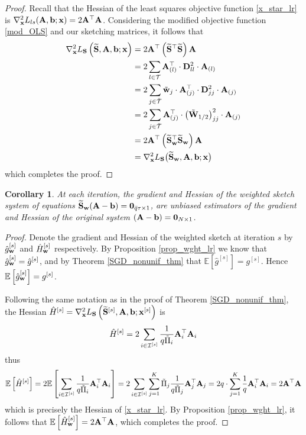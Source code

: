 \documentclass[journal,letterpaper,onecolumn,twoside,nofonttune]{IEEEtran}
\newcommand{\E}{\mathbb{E}}
\newcommand{\I}{\mathcal{I}}
\newcommand{\Tcal}{\mathcal{T}}
\newcommand{\Tbar}{\bar{\mathcal{T}}}
\newcommand{\bb}{\bold{b}}
\newcommand{\qbar}{\bar{q}}
\newcommand{\xb}{\bold{x}}
\newcommand{\Ab}{\bold{A}}
\newcommand{\Db}{\bold{D}}
\newcommand{\Sb}{\bold{S}}
\newcommand{\Sbwt}{\widetilde{\Sb}}
\newcommand{\Sbw}{\Sbwt_{\wb}}
\newcommand{\wb}{\bold{w}}
\newcommand{\Wb}{\bold{W}}
\newcommand{\gh}{\hat{g}}
\newcommand{\Hh}{\hat{H}}
\newcommand{\Pit}{\tilde{\Pi}}
\newcommand{\wbt}{\tilde{\wb}}
\newcommand{\Wbt}{\tilde{\Wb}}
\newtheorem{Cor}{Corollary}
\begin{document}
\begin{proof}
Recall that the Hessian of the least squares objective function \eqref{x_star_lr} is $\nabla_{\xb}^2L_{ls}(\Ab,\bb;\xb)=2\Ab^\top\Ab$. Considering the modified objective function \eqref{mod_OLS} and our sketching matrices, it follows that
\begin{align*}
  \nabla_{\xb}^2L_\Sb\left(\Sbwt,\Ab,\bb;\xb\right) &= 2\Ab^\top\left(\Sbwt^\top\Sbwt\right)\Ab\\
  &= 2\sum\limits_{l\in\Tcal}\Ab_{(l)}^\top \cdot\Db_{ll}^2 \cdot \Ab_{(l)}\\
  &= 2\sum\limits_{j\in\Tbar}\wbt_j\cdot\Ab_{(j)}^\top \cdot\Db_{jj}^2 \cdot \Ab_{(j)}\\
  &= 2\sum\limits_{j\in\Tbar}\Ab_{(j)}^\top \cdot\big(\Wbt_{1/2}\big)_{jj}^2 \cdot \Ab_{(j)}\\
  &= 2\Ab^\top\left(\Sbw^\top\Sbw\right)\Ab\\
  &= \nabla_{\xb}^2L_\Sb\big(\Sbw,\Ab,\bb;\xb\big)
\end{align*}
which completes the proof.%
\end{proof}

\begin{Cor}
\label{unb_est_Sw}
At each iteration, the gradient and Hessian of the weighted sketch system of equations $\Sbw(\Ab-\bb)=\bold{0}_{\qbar\tau\times1}$, are unbiased estimators of the gradient and Hessian of the original system $(\Ab-\bb)=\bold{0}_{N\times1}$.
\end{Cor}

\begin{proof}
Denote the gradient and Hessian of the weighted sketch at iteration $s$ by $\gh_\wb^{[s]}$ and $\Hh_\wb^{[s]}$ respectively. By Proposition \ref{prop_wght_lr} we know that $\gh_\wb^{[s]}=\gh^{[s]}$, and by Theorem \ref{SGD_nonunif_thm} that $\E\left[\gh^{[s]}\right]=g^{[s]}$. Hence $\E\left[\gh_\wb^{[s]}\right]=g^{[s]}$.

Following the same notation as in the proof of Theorem \ref{SGD_nonunif_thm}, the Hessian $\Hh^{[s]}=\nabla_{\xb}^2L_\Sb\left(\Sbwt^{[s]},\Ab,\bb;\xb^{[s]}\right)$ is 
$$ \Hh^{[s]} = 2\sum_{i\in\I^{[s]}}\frac{1}{q\Pit_i}\Ab_i^\top\Ab_i $$
thus
$$ \E\left[ \Hh^{[s]} \right] = 2\E\left[\sum_{i\in\I^{[s]}}\frac{1}{q\Pit_i}\Ab_i^\top\Ab_i\right] = 2\sum_{i\in\I^{[s]}}\sum_{j=1}^K\Pit_j\frac{1}{q\Pit_j}\Ab_j^\top\Ab_j = 2q\cdot\sum_{j=1}^K\frac{1}{q}\Ab_i^\top\Ab_i = 2\Ab^\top\Ab $$
which is precisely the Hessian of \eqref{x_star_lr}. By Proposition \ref{prop_wght_lr}, it follows that $\E\left[ \Hh_\wb^{[s]} \right]=2\Ab^\top\Ab$, which completes the proof.
\end{proof}
\end{document}

